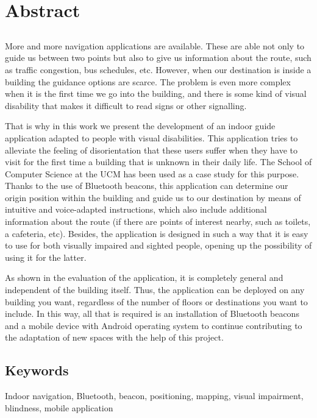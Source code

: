 \chapter*{Abstract}


\section*{}

More and more navigation applications are available. These are able not only to guide us between two points but also to give us information about the route, such as traffic congestion, bus schedules, etc. However, when our destination is inside a building the guidance options are scarce. The problem is even more complex when it is the first time we go into the building, and there is some kind of visual disability that makes it difficult to read signs or other signalling.

That is why in this work we present the development of an indoor guide application adapted to people with visual disabilities. This application tries to alleviate the feeling of disorientation that these users suffer when they have to visit for the first time a building that is unknown in their daily life. The School of Computer Science at the UCM has been used as a case study for this purpose. Thanks to the use of Bluetooth beacons, this application can determine our origin position within the building and guide us to our destination by means of intuitive and voice-adapted instructions, which also include additional information about the route (if there are points of interest nearby, such as toilets, a cafeteria, etc). Besides, the application is designed in such a way that it is easy to use for both visually impaired and sighted people, opening up the possibility of using it for the latter.

As shown in the evaluation of the application, it is completely general and independent of the building itself. Thus, the application can be deployed on any building you want, regardless of the number of floors or destinations you want to include.  In this way, all that is required is an installation of Bluetooth beacons and a mobile device with Android operating system to continue contributing to the adaptation of new spaces with the help of this project.

\section*{Keywords}

\noindent Indoor navigation, Bluetooth, beacon, positioning, mapping, visual impairment, blindness, mobile application



